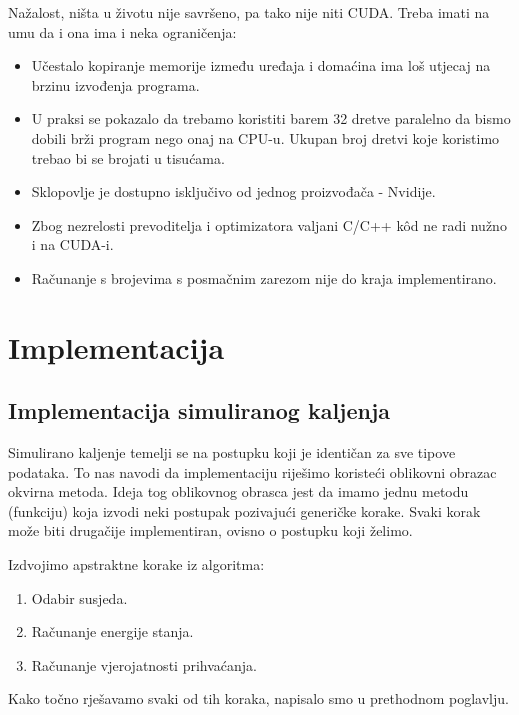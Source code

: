 \documentclass[times, utf8, zavrsni]{fer}
\begin{document}
Nažalost, ništa u životu nije savršeno, pa tako nije niti CUDA.
Treba imati na umu da i ona ima i neka ograničenja:

\begin{itemize}
\item
Učestalo kopiranje memorije između uređaja i domaćina ima loš
utjecaj na brzinu izvođenja programa.

\item
U praksi se pokazalo da trebamo koristiti barem 32 dretve paralelno
da bismo dobili brži program nego onaj na CPU-u. Ukupan broj dretvi
koje koristimo trebao bi se brojati u tisućama. 

\item
Sklopovlje je dostupno isključivo od jednog proizvođača - Nvidije. 

\item
Zbog nezrelosti prevoditelja i optimizatora valjani C/C++ kôd
ne radi nužno i na CUDA-i. 

\item
Računanje s brojevima s posmačnim zarezom nije do kraja implementirano. 
\end{itemize}






\chapter{Implementacija}


\section{Implementacija simuliranog kaljenja}
Simulirano kaljenje temelji se na postupku koji je identičan
za sve tipove podataka. To nas navodi da implementaciju 
riješimo koristeći oblikovni obrazac okvirna metoda. 
Ideja tog oblikovnog obrasca jest da imamo jednu
metodu (funkciju) koja izvodi neki postupak pozivajući
generičke korake. Svaki korak može biti drugačije implementiran,
ovisno o postupku koji želimo. 

Izdvojimo apstraktne korake iz algoritma:
\begin{enumerate}
\item 
Odabir susjeda.

\item
Računanje energije stanja.

\item
Računanje vjerojatnosti prihvaćanja.
\end{enumerate}
Kako točno rješavamo svaki od tih koraka, napisalo smo u
prethodnom poglavlju. 
\end{document}
